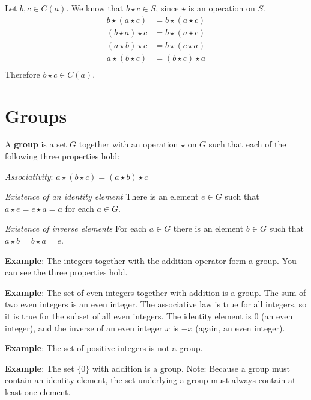 \documentclass{exam}
\newcommand{\?}{\stackrel{?}{=}}
\begin{document}
\begin{questions}
\begin{solution}
		Let $b, c \in C(a)$. We know that $b \star c \in S$, since $\star$ is an operation on $S$.
		\begin{align*}
			b \star (a \star c) &= b \star (a \star c) \\
			(b \star a) \star c &= b \star (a \star c) \\
			(a \star b) \star c &= b \star (c \star a) \\
			a \star (b \star c) &= (b \star c) \star a \\
		\end{align*}
		Therefore $b \star c \in C(a)$.
	\end{solution}

	\section*{Groups}

	\begin{mdframed}
		A \textbf{group} is a set $G$ together with an operation $\star$ on $G$ such
		that each of the following three properties hold:
		
		\textit{Associativity}: $ a \star (b \star c) = (a \star b) \star c $
		
		\textit{Existence of an identity element}
			There is an element $e \in G$ such that $a \star e = e \star a = a$ for
			each $a \in G$.
		
		\textit{Existence of inverse elements}
			For each $a \in G$ there is an element $b \in G$ such that $a \star b =
			b \star a = e$.
		
		\textbf{Example}: The integers together with the addition operator form
		a group. You can see the three properties hold.

		\textbf{Example}: The set of even integers together with addition is a
		group. The sum of two even integers is an even integer. The associative law
		is true for all integers, so it is true for the subset of all even integers.
		The identity element is $0$ (an even integer), and the inverse of an even
		integer $x$ is $-x$ (again, an even integer).

		\textbf{Example}: The set of positive integers is not a group.

		\textbf{Example}: The set $\{0\}$ with addition is a group. Note: Because a
		group must contain an identity element, the set underlying a group must
		always contain at least one element.
	\end{mdframed}


\end{questions}
\end{document}
